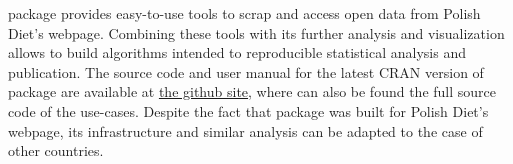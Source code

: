  package provides easy-to-use tools to scrap and access open data from Polish Diet's webpage. Combining these tools with its further analysis and visualization
allows to build algorithms intended to reproducible statistical analysis and publication. The source code and user manual for the latest CRAN version of  package are available at \href{https://github.com/mi2-warsaw/sejmRP}{the github site}, where can also be found the full source code of the use-cases. Despite the fact that  package was built for Polish Diet's webpage, its infrastructure and similar analysis can be adapted to the case of other countries.



\address{Piotr Smuda\\
  Faculty of Mathematics and Information Science\\
  Warsaw University of Technology\\
  Koszykowa 75, 00-662 Warsaw\\
  Poland\\}

\address{Przemysław Biecek\\
  Faculty of Mathematics and Information Science\\
  Warsaw University of Technology\\
  Koszykowa 75, 00-662 Warsaw\\
  Poland\\}
